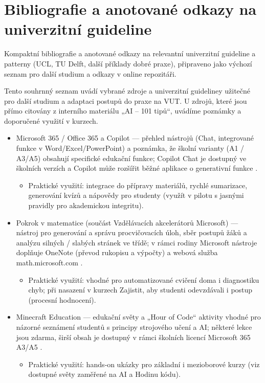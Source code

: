 \documentclass{report}%
\begin{document}
%
\section{Bibliografie a anotované odkazy na univerzitní guideline}%
Kompaktní bibliografie a anotované odkazy na relevantní univerzitní guideline a patterny (UCL, TU Delft, další příklady dobré praxe), připraveno jako výchozí seznam pro další studium a odkazy v online repozitáři.%


%
Tento souhrnný seznam uvádí vybrané zdroje a univerzitní guideliney užitečné pro další studium a adaptaci postupů do praxe na VUT. U zdrojů, které jsou přímo citovány z interního materiálu „AI – 101 tipů“, uvádíme poznámky a doporučené využití v kurzech.

\begin{itemize}
  \item Microsoft 365 / Office 365 a Copilot — přehled nástrojů (Chat, integrované funkce v Word/Excel/PowerPoint) a poznámka, že školní varianty (A1 / A3/A5) obsahují specifické edukační funkce; Copilot Chat je dostupný ve školních verzích a Copilot může rozšířit běžné aplikace o generativní funkce \cite{kb_ai_101_tipu_pdf_04e4a115_page_3_1}.
    \begin{itemize}
      \item Praktické využití: integrace do přípravy materiálů, rychlé sumarizace, generování kvízů a nápovědy pro studenty (využít v pilotu s jasnými pravidly pro akademickou integritu). %
    \end{itemize}

  \item Pokrok v matematice (součást Vzdělávacích akcelerátorů Microsoft) — nástroj pro generování a správu procvičovacích úloh, sběr postupů žáků a analýzu silných / slabých stránek ve třídě; v rámci rodiny Microsoft nástroje doplňuje OneNote (převod rukopisu a výpočty) a webová služba math.microsoft.com \cite{kb_ai_101_tipu_pdf_04e4a115_page_8_1}.
    \begin{itemize}
      \item Praktické využití: vhodné pro automatizované cvičení doma i diagnostiku chyb; při nasazení v kurzech Zajistit, aby studenti odevzdávali i postup (procesní hodnocení).
    \end{itemize}

  \item Minecraft Education — edukační světy a „Hour of Code“ aktivity vhodné pro názorné seznámení studentů s principy strojového učení a AI; některé lekce jsou zdarma, širší obsah je dostupný v rámci školních licencí Microsoft 365 A3/A5 \cite{kb_ai_101_tipu_pdf_04e4a115_page_15_2}.
    \begin{itemize}
      \item Praktické využití: hands‑on ukázky pro základní i mezioborové kurzy (viz dostupné světy zaměřené na AI a Hodinu kódu).
    \end{itemize}
\end{itemize}
\end{document}
